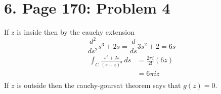 \documentclass{article}
\begin{document}
\newpage
\section*{6. Page 170: Problem 4}
If $z$ is inside then by the cauchy extension 
\[
	\frac{d^2}{ds^2} s^3+2s
	= \frac{d}{ds} 3s^2 + 2
	= 6s
\]
\begin{align*}
	\int_C \frac{s^3+2s}{(s-z)^3}\,ds &= \frac{2\pi i}{2!} \left(6z\right) \\
	&= 6\pi i z \\
\end{align*}
If $z$ is outside then the cauchy-goursat theorem says that $g(z) = 0$.
\end{document}
